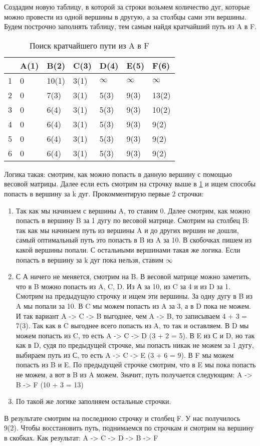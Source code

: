 Создадим новую таблицу, в которой за строки возьмем количество дуг, которые
можно провести из одной вершины в другую, а за столбцы сами эти вершины. Будем построчно
заполнять таблицу, тем самым найдя кратчайший путь из A в F.

\begin{table}[h]
    \centering
    \begin{tabular}[c]{ | l | l | l | l | l | l | l | }
        \hline
          & A(1) & B(2) & C(3) & D(4) & E(5) & F(6) \\ \hline
        1 & 0 & 10(1) & 3(1) & $\infty$ & $\infty$ & $\infty$ \\ \hline
        2 & 0 & 7(3) & 3(1) & 5(3) & 9(3) & 13(2) \\ \hline
        3 & 0 & 6(4) & 3(1) & 5(3) & 9(3) & 10(2) \\ \hline
        4 & 0 & 6(4) & 3(1) & 5(3) & 9(3) & 9(2) \\ \hline
        5 & 0 & 6(4) & 3(1) & 5(3) & 9(3) & 9(2) \\ \hline
        6 & 0 & 6(4) & 3(1) & 5(3) & 9(3) & 9(2) \\
        \hline
    \end{tabular}
    \caption{Поиск кратчайшего пути из A в F}
    \label{short_s}
\end{table}

Логика такая: смотрим, как можно попасть в данную вершину с помощью весовой матрицы.
Далее если есть смотрим на строчку выше в \ref{short_s} и ищем способы попасть в вершину за k дуг. Прокомментирую 
первые 2 строчки:
\begin{enumerate}
    \item Так как мы начинаем с вершины A, то ставим 0. Далее смотрим, как можно попасть 
    в вершину B за 1 дугу по весовой матрице. Смотрим на столбец B: так как мы начинаем путь из вершины A
    и до других вершин не дошли, самый оптимальный путь это попасть в B из A за 10. В скобочках пишем из 
    какой вершины попали. С остальными вершинами такая же логика. Если попасть в вершину за k дуг пока нельзя, ставим $\infty$
    \item С А ничего не меняется, смотрим на B. В весовой матрице можно заметить, что в B можно попасть из
    A, C, D. Из А за 10, из C за 4 и из D за 1. Смотрим на предыдущую строчку и ищем эти вершины. За одну дугу в B из A
    мы попали за 10. В C мы можем попасть из A за 3, а в D пока не можем. И так вариант A -> C -> B выгоднее, чем A -> B, 
    то записываем 4 + 3 = 7(3). Так как в C выгоднее всего попасть из A, то так и оставляем. В D мы можем попасть из C, то есть
    A -> C -> D (3 + 2 = 5). В E из С и D, но так как в D, судя по предыдущей строчке, мы попасть никак не можем за 1 дугу,
    выбираем путь из С, то есть A -> C -> E (3 + 6 = 9). В F мы можем попасть из B и E. По предыдущей строчке смотрим,
    что в E мы пока попасть не можем, а вот в B из A можем. Значит, путь получается следующим: A -> B -> F (10 + 3 = 13)
    \item По такой же логике заполняем остальные строчки.
\end{enumerate}
В результате смотрим на последнюю строчку и столбец F. У нас получилось 9(2). Чтобы восстановить путь, поднимаемся по строчкам
и смотрим на вершину в скобках. Как результат: A -> C -> D -> B -> F